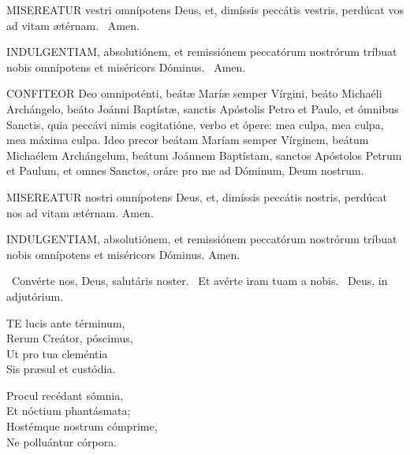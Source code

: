 
\lettrine[lines=2]{M}{ISEREATUR} vestri omnípotens Deus, et, dimíssis peccátis vestris, perdúcat vos ad vitam ætérnam. \R\ Amen.

\lettrine[lines=2]{I}{NDULGENTIAM}, absolutiónem, et remissiónem peccatórum nostrórum tríbuat nobis omnípotens et miséricors Dóminus. \R\ Amen.


\lettrine[lines=2]{C}{ONFITEOR} Deo omnipoténti, beátæ Maríæ semper Vírgini, beáto Michaéli Archángelo, beáto Joánni Baptístæ, sanctis Apóstolis Petro et Paulo, et ómnibus Sanctis, quia peccávi nimis cogitatióne, verbo et ópere: mea culpa, mea culpa, mea máxima culpa. Ideo precor beátam Maríam semper Vírginem, beátum Michaélem Archángelum, beátum Joánnem Baptístam, sanctos Apóstolos Petrum et Paulum, et omnes Sanctos, oráre pro me ad Dóminum, Deum nostrum.


\lettrine[lines=2]{M}{ISEREATUR} nostri omnípotens Deus, et, dimíssis peccátis nostris, perdúcat nos ad vitam ætérnam. Amen.

\lettrine[lines=2]{I}{NDULGENTIAM}, absolutiónem, et remissiónem peccatórum nostrórum tríbuat nobis omnípotens et miséricors Dóminus. Amen.


\V\ Convérte nos, Deus, salutáris noster. \R\ Et avérte iram tuam a nobis. \V\ Deus, in adjutórium.




\lettrine[lines=2]{T}{E} lucis ante términum,\\
Rerum Creátor, póscimus,\\
Ut pro tua cleméntia\\
Sis præsul et custódia.

Procul recédant sómnia,\\
Et nóctium phantásmata;\\
Hostémque nostrum cómprime,\\
Ne polluántur córpora.

